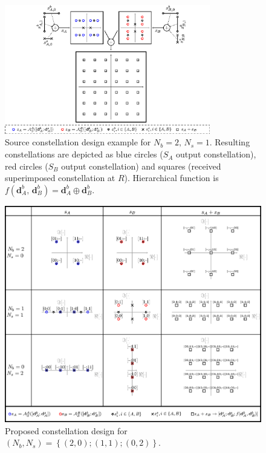 \documentclass{article}
\begin{document}
\begin{figure}
\centering{}\includegraphics[width=0.8\textwidth]{fig/d2_1}\caption{Source constellation design example for $N_{b}=2,\,N_{s}=1$. Resulting
constellations are depicted as blue circles ($S_{A}$ output constellation),
red circles ($S_{B}$ output constellation) and squares (received
superimposed constellation at $R$). Hierarchical function is $f\left(\mathbf{d}_{A}^{b},\,\mathbf{d}_{B}^{b}\right)=\mathbf{d}_{A}^{b}\oplus\mathbf{d}_{B}^{b}$.\label{fig:CTUpp_ConstellationDesignExample} }
\end{figure}


\begin{figure}
\begin{centering}
\includegraphics[width=1\textwidth]{fig/const_all_2}
\par\end{centering}

\caption{Proposed constellation design for $\left(N_{b},N_{s}\right)=\left\{ \left(2,0\right);\left(1,1\right);\left(0,2\right)\right\} $.\label{fig:CTUpp_ConstellationDesign_NbNs2} }
\end{figure}
\end{document}
